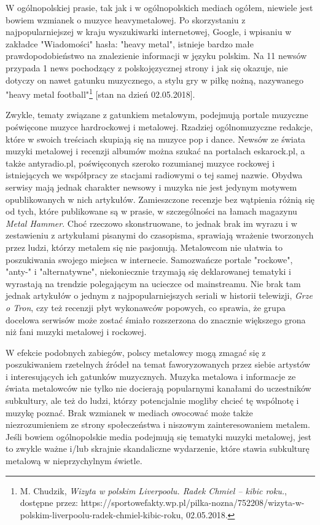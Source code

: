 \documentclass[12pt, a4paper, titlepage]{report}
\begin{document}


W ogólnopolskiej prasie, tak jak i w ogólnopolskich mediach ogółem, niewiele jest bowiem wzmianek o muzyce heavymetalowej. Po skorzystaniu z najpopularniejszej w kraju wyszukiwarki internetowej, Google, i wpisaniu w zakładce "Wiadomości" hasła: "heavy metal", istnieje bardzo małe prawdopodobieństwo na znalezienie informacji w języku polskim. Na 11 newsów przypada 1 news pochodzący z polskojęzycznej strony i jak się okazuje, nie dotyczy on nawet gatunku muzycznego, a stylu gry w piłkę nożną, nazywanego "heavy metal football"\footnote{M. Chudzik, \textit{Wizyta w polskim Liverpoolu. Radek Chmiel -- kibic roku.}, dostępne przez: https://sportowefakty.wp.pl/pilka-nozna/752208/wizyta-w-polskim-liverpoolu-radek-chmiel-kibic-roku, 02.05.2018.} [stan na dzień 02.05.2018].

Zwykle, tematy związane z gatunkiem metalowym, podejmują portale muzyczne poświęcone muzyce hardrockowej i metalowej. Rzadziej ogólnomuzyczne redakcje, które w swoich treściach skupiają się na muzyce pop i dance. Newsów ze świata muzyki metalowej i recenzji albumów można szukać na portalach eskarock.pl, a także antyradio.pl, poświęconych szeroko rozumianej muzyce rockowej i istniejących we współpracy ze stacjami radiowymi o tej samej nazwie. Obydwa serwisy mają jednak charakter newsowy i muzyka nie jest jedynym motywem opublikowanych w nich artykułów. Zamieszczone recenzje bez wątpienia różnią się od tych, które publikowane są w prasie, w szczególności na łamach magazynu \textit{Metal Hammer}. Choć rzeczowo skonstruowane, to jednak brak im wyrazu i w zestawieniu z artykułami pisanymi do czasopisma, sprawiają wrażenie tworzonych przez ludzi, którzy metalem się nie pasjonują. Metalowcom nie ułatwia to poszukiwania swojego miejsca w internecie. Samozwańcze portale "rockowe", "anty-" i "alternatywne", niekoniecznie trzymają się deklarowanej tematyki i wyrastają na trendzie polegającym na ucieczce od mainstreamu. Nie brak tam jednak artykułów o jednym z najpopularniejszych seriali w historii telewizji, \textit{Grze o Tron}, czy też recenzji płyt wykonawców popowych, co sprawia, że grupa docelowa serwisów może zostać śmiało rozszerzona do znacznie większego grona niż fani muzyki metalowej i rockowej. 

W efekcie podobnych zabiegów, polscy metalowcy mogą zmagać się z poszukiwaniem rzetelnych źródeł na temat faworyzowanych przez siebie artystów i interesujących ich gatunków muzycznych. Muzyka metalowa i informacje ze świata metalowców nie tylko nie docierają popularnymi kanałami do uczestników subkultury, ale też do ludzi, którzy potencjalnie mogliby chcieć tę wspólnotę i muzykę poznać. Brak wzmianek w mediach owocować może także niezrozumieniem ze strony społeczeństwa i niszowym zainteresowaniem metalem. Jeśli bowiem ogólnopolskie media podejmują się tematyki muzyki metalowej, jest to zwykle ważne i/lub skrajnie skandaliczne wydarzenie, które stawia subkulturę metalową w nieprzychylnym świetle.
\end{document}
